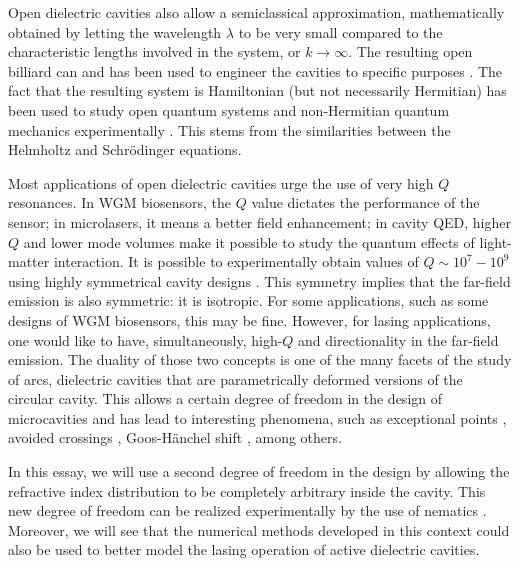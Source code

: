 Open dielectric cavities also allow a semiclassical approximation, mathematically
obtained by letting the wavelength $\lambda$ to be very small compared to 
the characteristic lengths involved in the system, or $k\rightarrow\infty$. 
The resulting open billiard can and has been used to engineer the cavities
to specific purposes \cite{KIM2013} . The fact
that the resulting system is Hamiltonian (but not necessarily Hermitian) 
has been used to study open quantum systems and non-Hermitian quantum 
mechanics experimentally \cite{BIT2010}. This stems from the similarities between the
Helmholtz and Schrödinger equations. 

Most applications of open dielectric cavities urge the use of very high $Q$
resonances. In WGM biosensors, the $Q$ value dictates the performance
of the sensor; in microlasers, it means a better field enhancement; in cavity
QED, higher $Q$ and lower mode volumes make it possible to study the quantum 
effects of light-matter interaction. It is possible to experimentally obtain
values of $Q\sim10^7-10^9$ using highly symmetrical cavity designs \cite{ARM2003,ARM2007,WAR2011}.
This symmetry implies that the far-field emission is also symmetric: it is
isotropic. For some applications, such as some designs of WGM biosensors, this may be
fine. However, for lasing applications, one would like to have, simultaneously, 
high-$Q$ and directionality in the far-field emission. The duality of those 
two concepts is one of the many facets of the study of \glspl{arc}, dielectric
cavities that are parametrically deformed versions of the circular cavity. 
This allows a certain degree of freedom in the design of microcavities and has
lead to interesting phenomena, such as exceptional points \cite{DET2009,RYU2009,HEI2012,BIT2014}, 
avoided crossings \cite{SON2013}, Goos-Hänchel shift \cite{UNT2008}, among others.

In this essay, we will use a second degree of freedom in the design
by allowing the refractive index distribution to be completely
arbitrary inside the cavity. This new degree of freedom can be realized
experimentally by the use of nematics \cite{PTA2013}. 
Moreover, we will see that the numerical
methods developed in this context could also be used to better model the lasing 
operation of active dielectric cavities.

